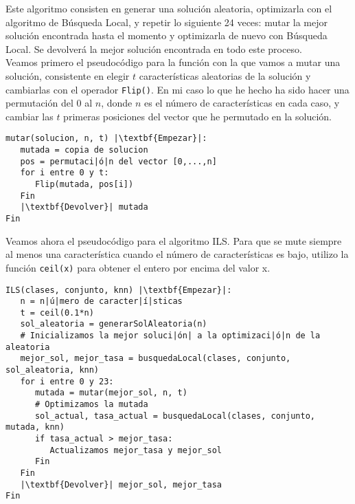 \documentclass[12pt]{article}
\begin{document}
Este algoritmo consisten en generar una solución aleatoria, optimizarla con el algoritmo de Búsqueda Local, y repetir lo siguiente 24 veces: mutar la mejor solución encontrada hasta el momento y optimizarla de nuevo con Búsqueda Local. Se devolverá la mejor solución encontrada en todo este proceso.\\

Veamos primero el pseudocódigo para la función con la que vamos a mutar una solución, consistente en elegir $t$ características aleatorias de la solución y cambiarlas con el operador \texttt{Flip()}. En mi caso lo que he hecho ha sido hacer una permutación del 0 al $n$, donde $n$ es el número de características en cada caso, y cambiar las $t$ primeras posiciones del vector que he permutado en la solución.

\begin{lstlisting}
mutar(solucion, n, t) |\textbf{Empezar}|:
   mutada = copia de solucion
   pos = permutaci|ó|n del vector [0,...,n]
   for i entre 0 y t:
      Flip(mutada, pos[i])
   Fin
   |\textbf{Devolver}| mutada
Fin

\end{lstlisting}

Veamos ahora el pseudocódigo para el algoritmo ILS. Para que se mute siempre al menos una característica cuando el número de características es bajo, utilizo la función \texttt{ceil(x)} para obtener el entero por encima del valor x.
\begin{lstlisting}
ILS(clases, conjunto, knn) |\textbf{Empezar}|:
   n = n|ú|mero de caracter|í|sticas
   t = ceil(0.1*n)
   sol_aleatoria = generarSolAleatoria(n)
   # Inicializamos la mejor soluci|ón| a la optimizaci|ó|n de la aleatoria 
   mejor_sol, mejor_tasa = busquedaLocal(clases, conjunto, sol_aleatoria, knn)
   for i entre 0 y 23:
      mutada = mutar(mejor_sol, n, t)
      # Optimizamos la mutada
      sol_actual, tasa_actual = busquedaLocal(clases, conjunto, mutada, knn)
      if tasa_actual > mejor_tasa:
         Actualizamos mejor_tasa y mejor_sol
      Fin
   Fin
   |\textbf{Devolver}| mejor_sol, mejor_tasa
Fin

\end{lstlisting}

\newpage
\end{document}
